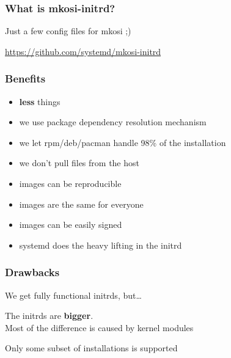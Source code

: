 \documentclass[]{beamer}
\newcommand\pp{}
\begin{document}
\begin{frame}
  \frametitle{What is mkosi-initrd?}
  \pp
  Just a few config files for mkosi ;)

  \vfill

  \url{https://github.com/systemd/mkosi-initrd}\vspace{-5em}
\end{frame}

\begin{frame}
  \frametitle{Benefits}

  \begin{itemize}
  \item \textbf{less} things
    \pp
  \item we use package dependency resolution mechanism
    \pp
  \item we let rpm/deb/pacman handle 98\% of the installation
    \pp
  \item we don't pull files from the host
    \pp
  \item images can be reproducible
    \pp
  \item images are the same for everyone
    \pp
  \item images can be easily signed
    \pp
  \item systemd does the heavy lifting in the initrd
  \end{itemize}
\end{frame}

\begin{frame}
  \frametitle{Drawbacks}

  We get fully functional initrds, but…
  \\\quad
  \pp

  The initrds are \textbf{bigger}.\\
  \pp
  Most of the difference is caused by kernel modules
  \\\quad

  \pp
  Only some subset of installations is supported
\end{frame}
\end{document}
